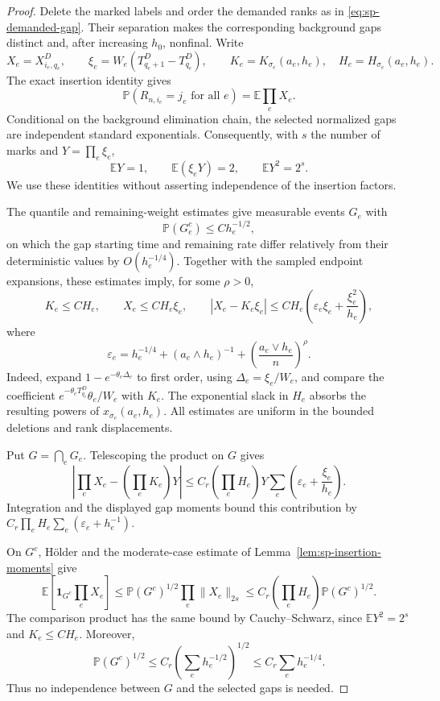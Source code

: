 \documentclass[11pt]{article}
\theoremstyle{remark}
\theoremstyle{plain}
\newcommand{\E}{\mathbb E}
\newcommand{\Pp}{\mathbb P}
\newcommand{\one}{\mathbf 1}
\begin{document}
\begin{proof}
Delete the marked labels and order the demanded ranks as in
\eqref{eq:sp-demanded-gap}.  Their separation makes the corresponding
background gaps distinct and, after increasing $h_0$, nonfinal.  Write
\[
 X_e=X_{i_e,q_e}^D,\qquad
 \xi_e=W_e(T_{q_e+1}^D-T_{q_e}^D),\qquad
 K_e=K_{\sigma_e}(a_e,h_e),\quad H_e=H_{\sigma_e}(a_e,h_e).
\]
The exact insertion identity gives
\[
 \Pp(R_{n,i_e}=j_e\text{ for all }e)=\E\prod_eX_e.
\]
Conditional on the background elimination chain, the selected normalized
gaps are independent standard exponentials.  Consequently, with $s$ the
number of marks and $Y=\prod_e\xi_e$,
\[
 \E Y=1,\qquad \E(\xi_eY)=2,\qquad \E Y^2=2^s.
\]
We use these identities without asserting independence of the insertion
factors.

The quantile and remaining-weight estimates give measurable events $G_e$
with
\[
 \Pp(G_e^c)\le Ch_e^{-1/2},
\]
on which the gap starting time and remaining rate differ relatively from
their deterministic values by $O(h_e^{-1/4})$.  Together with the sampled
endpoint expansions, these estimates imply, for some $\rho>0$,
\[
 K_e\le CH_e,\qquad X_e\le CH_e\xi_e,\qquad
 |X_e-K_e\xi_e|
 \le CH_e\left(\varepsilon_e\xi_e+\frac{\xi_e^2}{h_e}\right),
\]
where
\[
 \varepsilon_e=h_e^{-1/4}+(a_e\wedge h_e)^{-1}
 +\left(\frac{a_e\vee h_e}{n}\right)^\rho.
\]
Indeed, expand $1-e^{-\theta_e\Delta_e}$ to first order, using
$\Delta_e=\xi_e/W_e$, and compare the coefficient
$e^{-\theta_eT_{q_e}^D}\theta_e/W_e$ with $K_e$.
The exponential slack in $H_e$ absorbs the resulting powers of
$x_{\sigma_e}(a_e,h_e)$.  All estimates are uniform in the bounded
deletions and rank displacements.

Put $G=\bigcap_eG_e$.  Telescoping the product on $G$ gives
\[
 \left|\prod_eX_e-\left(\prod_eK_e\right)Y\right|
 \le C_r\left(\prod_eH_e\right)
 Y\sum_e\left(\varepsilon_e+\frac{\xi_e}{h_e}\right).
\]
Integration and the displayed gap moments bound this contribution by
$C_r\prod_eH_e\sum_e(\varepsilon_e+h_e^{-1})$.

On $G^c$, H\"older and the moderate-case estimate of
Lemma~\ref{lem:sp-insertion-moments} give
\begin{equation}\label{eq:sp-holder-weighted-bad}
 \E\left[\one_{G^c}\prod_eX_e\right]
 \le \Pp(G^c)^{1/2}\prod_e\|X_e\|_{2s}
 \le C_r\left(\prod_eH_e\right)\Pp(G^c)^{1/2}.
\end{equation}
The comparison product has the same bound by Cauchy--Schwarz, since
$\E Y^2=2^s$ and $K_e\le CH_e$.  Moreover,
\[
 \Pp(G^c)^{1/2}
 \le C_r\left(\sum_eh_e^{-1/2}\right)^{1/2}
 \le C_r\sum_eh_e^{-1/4}.
\]
Thus no independence between $G$ and the selected gaps is needed.


\end{proof}
\end{document}
